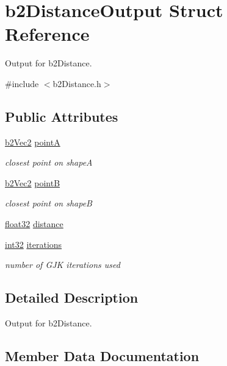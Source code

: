 \hypertarget{structb2_distance_output}{}\section{b2\+Distance\+Output Struct Reference}
\label{structb2_distance_output}


Output for b2\+Distance.  




{\ttfamily \#include $<$b2\+Distance.\+h$>$}

\subsection*{Public Attributes}
\begin{DoxyCompactItemize}
\item 
\mbox{\hyperlink{structb2_vec2}{b2\+Vec2}} \mbox{\hyperlink{structb2_distance_output_a7e0f1f44a64e596dc7d37570c69eefce}{pointA}}
\begin{DoxyCompactList}\small\item\em closest point on shapeA \end{DoxyCompactList}\item 
\mbox{\hyperlink{structb2_vec2}{b2\+Vec2}} \mbox{\hyperlink{structb2_distance_output_aa85beca17337a506cd4a924d0c6f92cc}{pointB}}
\begin{DoxyCompactList}\small\item\em closest point on shapeB \end{DoxyCompactList}\item 
\mbox{\hyperlink{b2_settings_8h_aacdc525d6f7bddb3ae95d5c311bd06a1}{float32}} \mbox{\hyperlink{structb2_distance_output_ae67f480ff37d4ab732e6366f485c7f55}{distance}}
\item 
\mbox{\hyperlink{b2_settings_8h_a43d43196463bde49cb067f5c20ab8481}{int32}} \mbox{\hyperlink{structb2_distance_output_ae2d4c84dd3d05ea4f4d20c91099ec8d5}{iterations}}
\begin{DoxyCompactList}\small\item\em number of G\+JK iterations used \end{DoxyCompactList}\end{DoxyCompactItemize}


\subsection{Detailed Description}
Output for b2\+Distance. 

\subsection{Member Data Documentation}
\mbox{\label{structb2_distance_output_ae67f480ff37d4ab732e6366f485c7f55}} 
